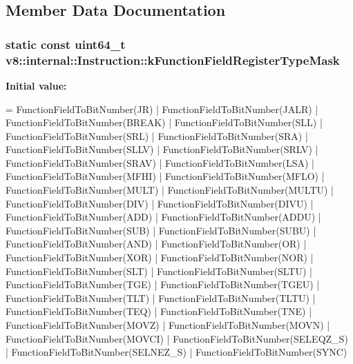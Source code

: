 \subsection{Member Data Documentation}
\subsubsection[{\texorpdfstring{k\+Function\+Field\+Register\+Type\+Mask}{kFunctionFieldRegisterTypeMask}}]{\setlength{\rightskip}{0pt plus 5cm}static const uint64\+\_\+t v8\+::internal\+::\+Instruction\+::k\+Function\+Field\+Register\+Type\+Mask\hspace{0.3cm}{\ttfamily [static]}}\hypertarget{classv8_1_1internal_1_1_instruction_a594598b64ae9cf76309521fc938c6e1e}{}\label{classv8_1_1internal_1_1_instruction_a594598b64ae9cf76309521fc938c6e1e}
{\bfseries Initial value\+:}
\begin{DoxyCode}
=
      FunctionFieldToBitNumber(JR) | FunctionFieldToBitNumber(JALR) |
      FunctionFieldToBitNumber(BREAK) | FunctionFieldToBitNumber(SLL) |
      FunctionFieldToBitNumber(SRL) | FunctionFieldToBitNumber(SRA) |
      FunctionFieldToBitNumber(SLLV) | FunctionFieldToBitNumber(SRLV) |
      FunctionFieldToBitNumber(SRAV) | FunctionFieldToBitNumber(LSA) |
      FunctionFieldToBitNumber(MFHI) | FunctionFieldToBitNumber(MFLO) |
      FunctionFieldToBitNumber(MULT) | FunctionFieldToBitNumber(MULTU) |
      FunctionFieldToBitNumber(DIV) | FunctionFieldToBitNumber(DIVU) |
      FunctionFieldToBitNumber(ADD) | FunctionFieldToBitNumber(ADDU) |
      FunctionFieldToBitNumber(SUB) | FunctionFieldToBitNumber(SUBU) |
      FunctionFieldToBitNumber(AND) | FunctionFieldToBitNumber(OR) |
      FunctionFieldToBitNumber(XOR) | FunctionFieldToBitNumber(NOR) |
      FunctionFieldToBitNumber(SLT) | FunctionFieldToBitNumber(SLTU) |
      FunctionFieldToBitNumber(TGE) | FunctionFieldToBitNumber(TGEU) |
      FunctionFieldToBitNumber(TLT) | FunctionFieldToBitNumber(TLTU) |
      FunctionFieldToBitNumber(TEQ) | FunctionFieldToBitNumber(TNE) |
      FunctionFieldToBitNumber(MOVZ) | FunctionFieldToBitNumber(MOVN) |
      FunctionFieldToBitNumber(MOVCI) | FunctionFieldToBitNumber(SELEQZ\_S) |
      FunctionFieldToBitNumber(SELNEZ\_S) | FunctionFieldToBitNumber(SYNC)
\end{DoxyCode}
